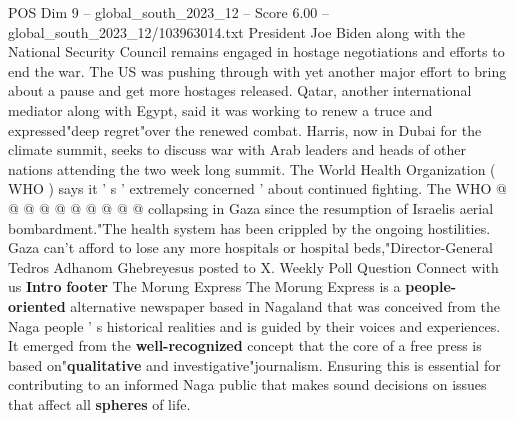\begin{textsample}{POS Dim 9 – global\_south\_2023\_12 – Score 6.00 – global\_south\_2023\_12/103963014.txt}
President Joe Biden along with the National Security Council remains engaged in hostage negotiations and efforts to end the war.
The US was pushing through with yet another major effort to bring about a pause and get more hostages released.
Qatar, another international mediator along with Egypt, said it was working to renew a truce and expressed"deep regret"over the renewed combat.
Harris, now in Dubai for the climate summit, seeks to discuss war with Arab leaders and heads of other nations attending the two week long summit.
The World Health Organization ( WHO ) says it ' s ' extremely concerned ' about continued fighting.
The WHO @ @ @ @ @ @ @ @ @ @ collapsing in Gaza since the resumption of Israelis aerial bombardment."The health system has been crippled by the ongoing hostilities.
Gaza can't afford to lose any more hospitals or hospital beds,"Director-General Tedros Adhanom Ghebreyesus posted to X.
Weekly Poll Question Connect with us \textbf{Intro} \textbf{footer} The Morung Express The Morung Express is a \textbf{people-oriented} alternative newspaper based in Nagaland that was conceived from the Naga people ' s historical realities and is guided by their voices and experiences.
It emerged from the \textbf{well-recognized} concept that the core of a free press is based on"\textbf{qualitative} and investigative"journalism.
Ensuring this is essential for contributing to an informed Naga public that makes sound decisions on issues that affect all \textbf{spheres} of life.

\end{textsample}
